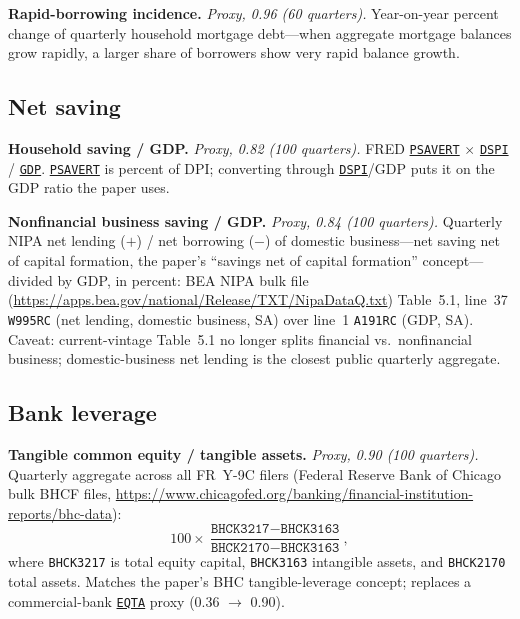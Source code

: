 \documentclass[11pt]{article}
\newcommand{\fred}[1]{\href{https://fred.stlouisfed.org/series/#1}{\texttt{#1}}}
\begin{document}
\textbf{Rapid-borrowing incidence.} \textit{Proxy, 0.96 (60 quarters).}
Year-on-year percent change of quarterly household mortgage debt---when
aggregate mortgage balances grow rapidly, a larger share of borrowers
show very rapid balance growth.

\subsection{Net saving}

\textbf{Household saving / GDP.} \textit{Proxy, 0.82 (100 quarters).}
FRED \fred{PSAVERT} $\times$ \fred{DSPI} / \fred{GDP}.
\fred{PSAVERT} is percent of DPI; converting through
\fred{DSPI}/GDP puts it on the GDP ratio the paper uses.

\textbf{Nonfinancial business saving / GDP.} \textit{Proxy, 0.84 (100
quarters).} Quarterly NIPA net lending ($+$) / net borrowing ($-$) of
domestic business---net saving net of capital formation, the paper's
``savings net of capital formation'' concept---divided by GDP, in
percent: BEA NIPA bulk file
(\url{https://apps.bea.gov/national/Release/TXT/NipaDataQ.txt})
Table~5.1, line~37 \texttt{W995RC} (net
lending, domestic business, SA) over line~1 \texttt{A191RC} (GDP, SA).
Caveat: current-vintage Table~5.1 no longer splits financial vs.\
nonfinancial business; domestic-business net lending is the closest
public quarterly aggregate.

\subsection{Bank leverage}

\textbf{Tangible common equity / tangible assets.} \textit{Proxy, 0.90
(100 quarters).} Quarterly aggregate across all FR~Y-9C filers
(Federal Reserve Bank of Chicago bulk BHCF files,
\url{https://www.chicagofed.org/banking/financial-institution-reports/bhc-data}):
\begin{equation}
100 \times \frac{\texttt{BHCK3217} - \texttt{BHCK3163}}
{\texttt{BHCK2170} - \texttt{BHCK3163}},
\end{equation}
where \texttt{BHCK3217} is total equity capital, \texttt{BHCK3163}
intangible assets, and \texttt{BHCK2170} total assets.  Matches the
paper's BHC tangible-leverage concept; replaces a commercial-bank
\fred{EQTA} proxy (0.36 $\to$ 0.90).
\end{document}
